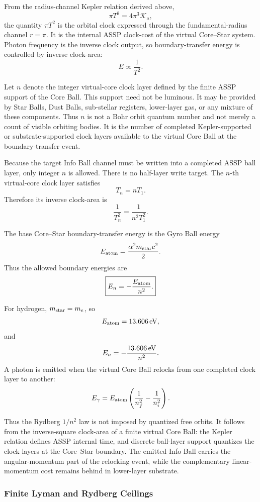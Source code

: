 \documentclass[11pt,a4paper]{article}
\begin{document}
From the radius-channel Kepler relation derived above,
\[
\pi T^2
=
4\pi^3\mathcal{K}_a,
\]
the quantity \(\pi T^2\) is the orbital clock expressed through the fundamental-radius channel \(r=\pi\). It is the internal ASSP clock-cost of the virtual Core--Star system. Photon frequency is the inverse clock output, so boundary-transfer energy is controlled by inverse clock-area:
\[
E\propto\frac{1}{T^2}.
\]

Let \(n\) denote the integer virtual-core clock layer defined by the finite ASSP support of the Core Ball. This support need not be luminous. It may be provided by Star Balls, Dust Balls, sub-stellar registers, lower-layer gas, or any mixture of these components. Thus \(n\) is not a Bohr orbit quantum number and not merely a count of visible orbiting bodies. It is the number of completed Kepler-supported or substrate-supported clock layers available to the virtual Core Ball at the boundary-transfer event.

Because the target Info Ball channel must be written into a completed ASSP ball layer, only integer \(n\) is allowed. There is no half-layer write target. The \(n\)-th virtual-core clock layer satisfies
\[
T_n=nT_1.
\]
Therefore its inverse clock-area is
\[
\frac{1}{T_n^2}
=
\frac{1}{n^2T_1^2}.
\]

The base Core--Star boundary-transfer energy is the Gyro Ball energy
\[
E_{\rm atom}
=
\frac{\alpha^2m_{\rm star}c^2}{2}.
\]
Thus the allowed boundary energies are
\[
\boxed{
E_n
=
-\frac{E_{\rm atom}}{n^2}.
}
\]

For hydrogen, \(m_{\rm star}=m_e\), so
\[
E_{\rm atom}=13.606\,{\rm eV},
\]
and
\[
E_n=-\frac{13.606\,{\rm eV}}{n^2}.
\]
A photon is emitted when the virtual Core Ball relocks from one completed clock layer to another:
\[
E_\gamma
=
E_{\rm atom}
\left(
\frac{1}{n_f^2}
-
\frac{1}{n_i^2}
\right).
\]

Thus the Rydberg \(1/n^2\) law is not imposed by quantized free orbits. It follows from the inverse-square clock-area of a finite virtual Core Ball: the Kepler relation defines ASSP internal time, and discrete ball-layer support quantizes the clock layers at the Core--Star boundary. The emitted Info Ball carries the angular-momentum part of the relocking event, while the complementary linear-momentum cost remains behind in lower-layer substrate. 

\subsubsection{Finite Lyman and Rydberg Ceilings}
\end{document}
